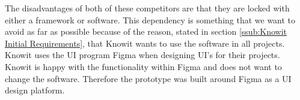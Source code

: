 The disadvantages of both of these competitors are that they are locked with either a framework or software. This dependency is something that we want to avoid as far as possible because of the reason, stated in section \ref{ssub:Knowit Initial Requirements}, that Knowit wants to use the software in all projects. Knowit uses the UI program Figma when designing UI's for their projects. Knowit is happy with the functionality within Figma and does not want to change the software. Therefore the prototype was built around Figma as a UI design platform. 




